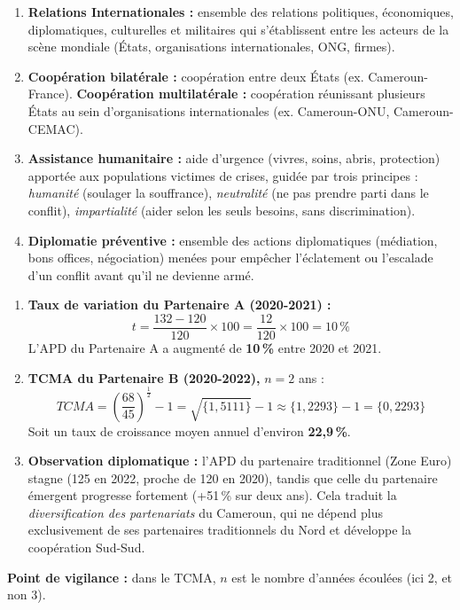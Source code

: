 \documentclass[11pt]{article}
\begin{document}
\begin{corrige}
\begin{enumerate}
    \item \textbf{Relations Internationales :} ensemble des relations politiques, économiques, diplomatiques, culturelles et militaires qui s'établissent entre les acteurs de la scène mondiale (États, organisations internationales, ONG, firmes).
    \item \textbf{Coopération bilatérale :} coopération entre deux États (ex. Cameroun-France). \textbf{Coopération multilatérale :} coopération réunissant plusieurs États au sein d'organisations internationales (ex. Cameroun-ONU, Cameroun-CEMAC).
    \item \textbf{Assistance humanitaire :} aide d'urgence (vivres, soins, abris, protection) apportée aux populations victimes de crises, guidée par trois principes : \emph{humanité} (soulager la souffrance), \emph{neutralité} (ne pas prendre parti dans le conflit), \emph{impartialité} (aider selon les seuls besoins, sans discrimination).
    \item \textbf{Diplomatie préventive :} ensemble des actions diplomatiques (médiation, bons offices, négociation) menées pour empêcher l'éclatement ou l'escalade d'un conflit avant qu'il ne devienne armé.
\end{enumerate}
\end{corrige}

\begin{corrige}
\begin{enumerate}
    \item \textbf{Taux de variation du Partenaire A (2020-2021) :}
    \[ t = \frac{132 - 120}{120} \times 100 = \frac{12}{120} \times 100 = 10\,\% \]
    L'APD du Partenaire A a augmenté de \textbf{10\,\%} entre 2020 et 2021.
    \item \textbf{TCMA du Partenaire B (2020-2022), } $n = 2$ ans :
    \[ TCMA = \left(\frac{68}{45}\right)^{\frac{1}{2}} - 1 = \sqrt{\{1,5111\}} - 1 \approx \{1,2293\} - 1 = \{0,2293\} \]
    Soit un taux de croissance moyen annuel d'environ \textbf{22,9\,\%}.
    \item \textbf{Observation diplomatique :} l'APD du partenaire traditionnel (Zone Euro) stagne (125 en 2022, proche de 120 en 2020), tandis que celle du partenaire émergent progresse fortement (+51\,\% sur deux ans). Cela traduit la \emph{diversification des partenariats} du Cameroun, qui ne dépend plus exclusivement de ses partenaires traditionnels du Nord et développe la coopération Sud-Sud.
\end{enumerate}
\textbf{Point de vigilance :} dans le TCMA, $n$ est le nombre d'années écoulées (ici 2, et non 3).
\end{corrige}
\end{document}
